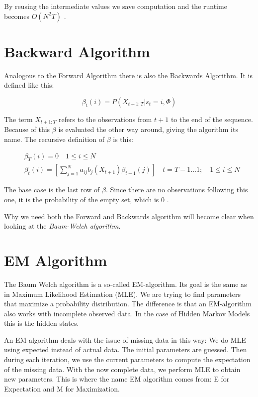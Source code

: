 By reusing the intermediate values we save computation and the runtime becomes $O(N^2 T)$ \parencite{huang2001spoken}. 

\section{Backward Algorithm}

Analogous to the Forward Algorithm there is also the Backwards Algorithm. It is defined like this:

\begin{equation}
   \beta_{t}(i)=P\left(X_{t+1:T} | s_{t}=i, \Phi\right) 
\end{equation}

The term $X_{t+1:T}$ refers to the observations from $t+1$ to the end of the sequence. Because of this $\beta$ is evaluated the other way around, giving the algorithm its name. The recursive definition of $\beta$ is this:

\begin{equation}
\begin{aligned}
   &\beta_{T}(i)=0 \quad 1 \leq i \leq N  \\
   &\beta_{t}(i)=\left[\sum_{j=1}^{N} a_{i j} b_{j}\left(X_{t+1}\right) \beta_{t+1}(j)\right] \quad t=T-1 \ldots 1 ; \quad 1 \leq i \leq N
   \label{eq:beta-def}
\end{aligned}
\end{equation}

The base case is the last row of $\beta$. Since there are no observations following this one, it is the probability of the empty set, which is 0 \parencite{huang2001spoken}.

Why we need both the Forward and Backwards algorithm will become clear when looking at the \emph{Baum-Welch algorithm}.

\section{EM Algorithm}

The Baum Welch algorithm is a so-called EM-algorithm. Its goal is the same as in Maximum Likelihood Estimation (MLE). We are trying to find parameters that maximize a probability distribution. The difference is that an EM-algorithm also works with incomplete observed data. In the case of Hidden Markov Models this is the hidden states. 

An EM algorithm deals with the issue of missing data in this way: We do MLE using expected instead of actual data. The initial parameters are guessed. Then during each iteration, we use the current parameters to compute the expectation of the missing data. With the now complete data, we perform MLE to obtain new parameters. This is where the name EM algorithm comes from: E for Expectation and M for Maximization. 
 
